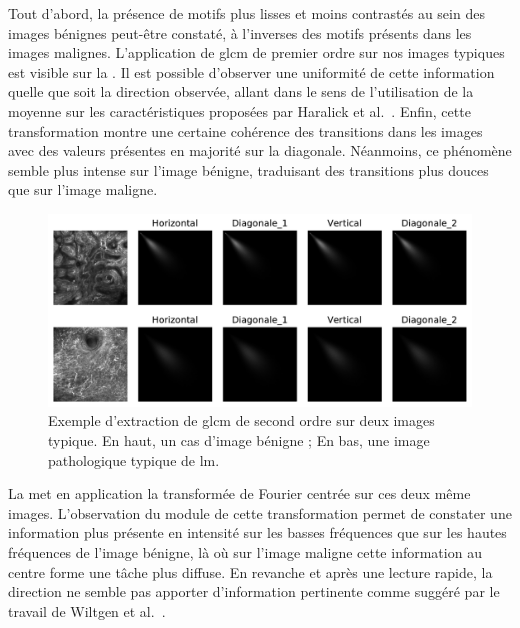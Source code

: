 Tout d'abord, la présence de motifs plus lisses et moins contrastés au sein des images bénignes peut-être constaté, à l'inverses des motifs présents dans les images malignes. L'application de \gls{glcm} de premier ordre sur nos images typiques est visible sur la . Il est possible d'observer une uniformité de cette information quelle que soit la direction observée, allant dans le sens de l'utilisation de la moyenne sur les caractéristiques proposées par Haralick et al.~\cite{Wiltgen2008}. Enfin, cette transformation montre une certaine cohérence des transitions dans les images avec des valeurs présentes en majorité sur la diagonale. Néanmoins, ce phénomène semble plus intense sur l'image bénigne, traduisant des transitions plus douces que sur l'image maligne.\par

\begin{figure}[H]
    \centering
    \includegraphics[width=\linewidth]{contents/chapter_4/resources/example_glcm.pdf}
    \caption{Exemple d'extraction de \gls{glcm} de second ordre sur deux images typique. En haut, un cas d'image bénigne ; En bas, une image pathologique typique de \gls{lm}.}
    \label{fig:example_glcm}
\end{figure}\par

La  met en application la transformée de Fourier centrée sur ces deux même images. L'observation du module de cette transformation permet de constater une information plus présente en intensité sur les basses fréquences que sur les hautes fréquences de l'image bénigne, là où sur l'image maligne cette information au centre forme une tâche plus diffuse. En revanche et après une lecture rapide, la direction ne semble pas apporter d'information pertinente comme suggéré par le travail de Wiltgen et al.~\cite{Wiltgen2008}.\par

